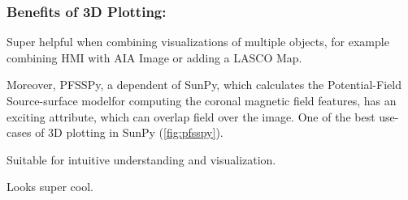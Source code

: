 \subsubsection{Benefits of 3D Plotting:} \label{sec:benefits_of_3d_plot}
    \vspace*{-0.4cm}
    \begin{focus}
        \item Super helpful when combining visualizations of multiple objects, for example combining HMI with AIA Image or adding a LASCO Map.
        \item Moreover, PFSSPy, a dependent of SunPy, which calculates the Potential-Field Source-surface modelfor computing the coronal magnetic field features, has an exciting attribute, which can overlap field over the image. One of the best use-cases of 3D plotting in SunPy (\autoref{fig:pfsspy}).
        \item Suitable for intuitive understanding and visualization.
        \item Looks super cool.
    \end{focus}
